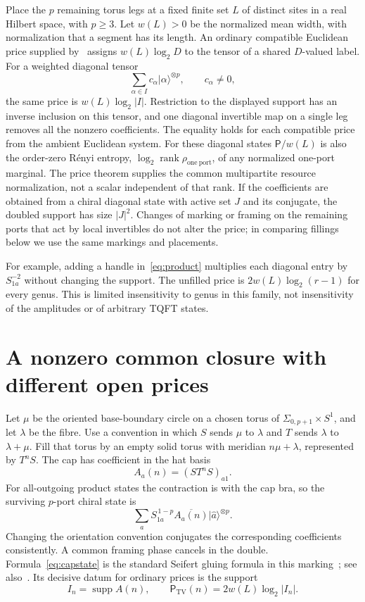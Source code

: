 \documentclass[11pt]{article}
\theoremstyle{remark}
\DeclareMathOperator{\supp}{supp}
\newcommand{\TV}{\mathrm{TV}}
\newcommand{\TVprice}{\mathsf{P}}
\newcommand{\ket}[1]{\lvert #1\rangle}
\newcommand{\tensor}{\mathbin{\otimes}}
\newcommand{\Surf}[2]{\Sigma_{#1,#2}}
\begin{document}
Place the \(p\) remaining torus legs at a fixed finite set \(L\) of distinct sites in a real Hilbert space, with \(p\geq 3\). Let \(w(L)>0\) be the normalized mean width, with normalization that a segment has its length. An ordinary compatible Euclidean price supplied by~\cite[Theorem~1.1]{OpenAI} assigns \(w(L)\log_2 D\) to the tensor of a shared \(D\)-valued label. For a weighted diagonal tensor
\[
 \sum_{\alpha\in I} c_\alpha \ket{\alpha}^{\tensor p},\qquad
 c_\alpha\ne 0,
\]
the same price is \(w(L)\log_2 |I|\). Restriction to the displayed support has an inverse inclusion on this tensor, and one diagonal invertible map on a single leg removes all the nonzero coefficients. The equality holds for each compatible price from the ambient Euclidean system. For these diagonal states \(\TVprice/w(L)\) is also the order-zero R\'enyi entropy, \(\log_2\operatorname{rank}\rho_{\mathrm{one\ port}}\), of any normalized one-port marginal. The price theorem supplies the common multipartite resource normalization, not a scalar independent of that rank. If the coefficients are obtained from a chiral diagonal state with active set \(J\) and its conjugate, the doubled support has size \(|J|^2\). Changes of marking or framing on the remaining ports that act by local invertibles do not alter the price; in comparing fillings below we use the same markings and placements.

For example, adding a handle in~\eqref{eq:product} multiplies each diagonal entry by \(S_{1a}^{-2}\) without changing the support. The unfilled price is \(2w(L)\log_2(r-1)\) for every genus. This is limited insensitivity to genus in this family, not insensitivity of the amplitudes or of arbitrary TQFT states.

\section{A nonzero common closure with different open prices}\label{sec:surgery}

Let \(\mu\) be the oriented base-boundary circle on a chosen torus of \(\Surf{0}{p+1}\times S^1\), and let \(\lambda\) be the fibre. Use a convention in which \(S\) sends \(\mu\) to \(\lambda\) and \(T\) sends \(\lambda\) to \(\lambda+\mu\). Fill that torus by an empty solid torus with meridian \(n\mu+\lambda\), represented by \(T^n S\). The cap has coefficient in the hat basis
\begin{equation}\label{eq:A}
 A_a(n)=(S T^n S)_{a1}.
\end{equation}
For all-outgoing product states the contraction is with the cap bra, so the surviving \(p\)-port chiral state is
\begin{equation}\label{eq:capstate}
 \sum_a S_{1a}^{\,1-p}\overline{A_a(n)}\ket{\widehat a}^{\tensor p}.
\end{equation}
Changing the orientation convention conjugates the corresponding coefficients consistently. A common framing phase cancels in the double. Formula~\eqref{eq:capstate} is the standard Seifert gluing formula in this marking~\cite[Eq.~(119)]{Fibered}; see also~\cite{Jeffrey,Hansen,HansenTakata}. Its decisive datum for ordinary prices is the support
\[
 I_n=\supp A(n), \qquad
 \TVprice_{\TV}(n)=2w(L)\log_2|I_n|.
\]
\end{document}

